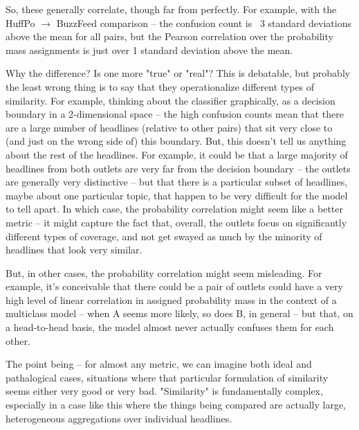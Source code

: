 \documentclass{scrartcl}
\begin{document}
So, these generally correlate, though far from perfectly. For example, with the HuffPo $\rightarrow$ BuzzFeed comparison -- the confusion count is ~3 standard deviations above the mean for all pairs, but the Pearson correlation over the probability mass assignments is just over 1 standard deviation above the mean.

Why the difference? Is one more "true" or "real"? This is debatable, but probably the least wrong thing is to say that they operationalize different types of similarity. For example, thinking about the classifier graphically, as a decision boundary in a 2-dimensional space -- the high confusion counts mean that there are a large number of headlines (relative to other pairs) that sit very close to (and just on the wrong side of) this boundary. But, this doesn't tell us anything about the rest of the headlines. For example, it could be that a large majority of headlines from both outlets are very far from the decision boundary -- the outlets are generally very distinctive -- but that there is a particular subset of headlines, maybe about one particular topic, that happen to be very difficult for the model to tell apart. In which case, the probability correlation might seem like a better metric -- it might capture the fact that, overall, the outlets focus on significantly different types of coverage, and not get swayed as much by the minority of headlines that look very similar.

But, in other cases, the probability correlation might seem misleading. For example, it's conceivable that there could be a pair of outlets could have a very high level of linear correlation in assigned probability mass in the context of a multiclass model -- when A seems more likely, so does B, in general -- but that, on a head-to-head basis, the model almost never actually confuses them for each other.

The point being -- for almost any metric, we can imagine both ideal and pathalogical cases, situations where that particular formulation of similarity seems either very good or very bad. "Similarity" is fundamentally complex, especially in a case like this where the things being compared are actually large, heterogeneous aggregations over individual headlines.
\end{document}
